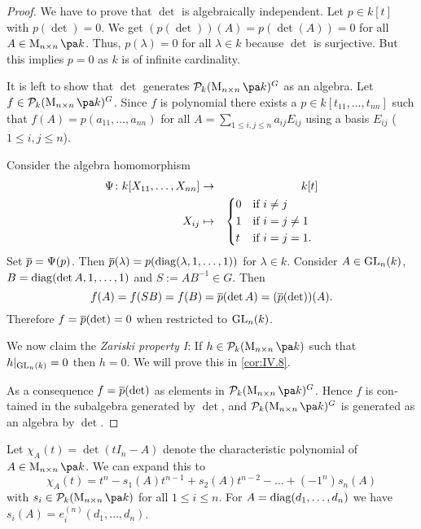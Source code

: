 \documentclass[12pt,a4paper]{scrartcl}
\theoremstyle{cplain}
\theoremstyle{cplain}
\theoremstyle{cplain}
\theoremstyle{definition}
\begin{document}
\begin{otherlanguage}{english}
\begin{proof}
  We have to prove that $\det$ is algebraically independent. Let $p \in k[t]$ with $p(\det) = 0$. We get $(p(\det))(A) = p(\det(A)) = 0$ for all $A \in \Mat n k$. Thus, $p(\lambda) = 0$ for all $\lambda \in k$ because $\det$ is surjective. But this implies $p=0$ as $k$ is of infinite cardinality.
  
  It is left to show that $\det$ generates $\Ps_k(\Mat n k)^G$ as an algebra. Let $f \in \Ps_k(\Mat n k)^G$. Since $f$ is polynomial there exists a $p \in k[t_{11},\ldots,t_{nn}]$ such that $f(A) = p(a_{11},\ldots,a_{nn})$ for all $A = \sum_{1\le i,j \le n} a_{ij}E_{ij}$ using a basis $E_{ij}$ ($1\le i,j\le n$).
  
  Consider the algebra homomorphism
  \begin{eqnarray*}
    \Psi\colon k[X_{11},\ldots,X_{nn}] &\to& k[t] \\
    X_{ij} &\mapsto& \begin{cases*}
      0 & if $i \neq j$\\
      1 & if $i = j \neq 1$ \\
      t & if $i = j = 1$.
    \end{cases*}
  \end{eqnarray*}
  Set $\overline p = \Psi(p)$. Then $\overline p(\lambda) = p(\operatorname{diag}(\lambda,1,\ldots,1))$ for $\lambda \in k$. Consider $A \in \operatorname{GL}_n(k)$, $B = \operatorname{diag}(\det A,1,\ldots,1)$ and $S := AB^{-1} \in G$. Then \[ f(A) = f(SB) = f(B) = \overline p(\det A) = (\overline p(\det))(A). \] Therefore $f=\overline p(\det) = 0$ when restricted to $\operatorname{GL}_n(k)$.
  
  We now claim the \emph{Zariski property I}: If $h\in \Ps_k(\Mat n k)$ such that $h|_{\operatorname{GL}_n(k)} = 0$ then $h=0$. We will prove this in \cref{cor:IV.8}.
  
  As a consequence $f=\overline p(\det)$ as elements in $\Ps_k(\Mat n k)^G$. Hence $f$ is contained in the subalgebra generated by $\det$, and $\Ps_k(\Mat n k)^G$ is generated as an algebra by $\det$.
\end{proof}

Let $\chi_A(t) = \det(tI_n-A)$ denote the characteristic polynomial of $A \in \Mat n k$. We can expand this to \[\chi_A(t) = t^n-s_1(A)t^{n-1} + s_2(A)t^{n-2} - \ldots + (-1^n)s_n(A) \] with $s_i \in \Ps_k(\Mat nk)$ for all $1\le i \le n$. For $A= \operatorname{diag}(d_1,\ldots,d_n)$ we have $s_i(A) = e_i^{(n)}(d_1,\ldots,d_n)$.



\end{otherlanguage}
\end{document}
